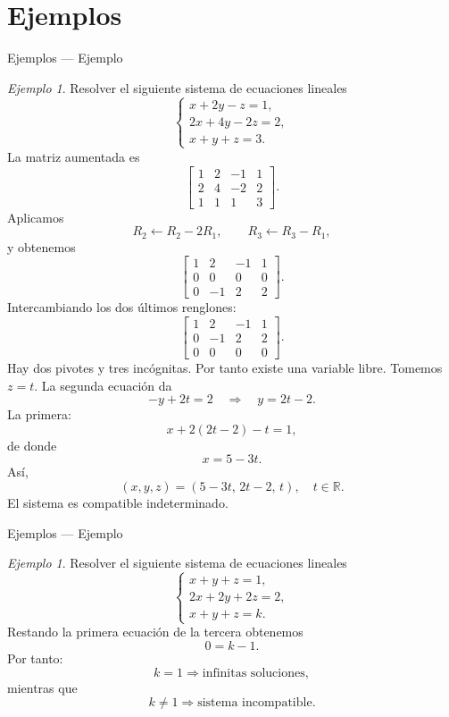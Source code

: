 \documentclass[aspectratio=169,11pt]{beamer}
\theoremstyle{remark}
\newtheorem{Ejem}[definicion]{Ejemplo}
\newcommand{\R}{\mathbb{R}}
\begin{document}
\section{Ejemplos}
\begin{frame}[shrink=5]{Ejemplos — Ejemplo}
\footnotesize
\begin{Ejem} Resolver el siguiente sistema de ecuaciones lineales
\[
\begin{cases}
x+2y-z=1,\\
2x+4y-2z=2,\\
x+y+z=3.
\end{cases}
\]
La matriz aumentada es
\[
\left[
\begin{array}{ccc|c}
1&2&-1&1\\
2&4&-2&2\\
1&1&1&3
\end{array}
\right].
\]
Aplicamos
\[
R_2\leftarrow R_2-2R_1,\qquad
R_3\leftarrow R_3-R_1,
\]
y obtenemos
\[
\left[
\begin{array}{ccc|c}
1&2&-1&1\\
0&0&0&0\\
0&-1&2&2
\end{array}
\right].
\]
Intercambiando los dos últimos renglones:
\[
\left[
\begin{array}{ccc|c}
1&2&-1&1\\
0&-1&2&2\\
0&0&0&0
\end{array}
\right].
\]
Hay dos pivotes y tres incógnitas. Por tanto existe una variable libre. Tomemos $z=t$. La segunda
ecuación da
\[
-y+2t=2\quad\Longrightarrow\quad y=2t-2.
\]
La primera:
\[
x+2(2t-2)-t=1,
\]
de donde
\[
x=5-3t.
\]
Así,
\[
\boxed{(x,y,z)=(5-3t,\,2t-2,\,t),\quad t\in\R.}
\]
El sistema es compatible indeterminado.
\end{Ejem}
\end{frame}

\begin{frame}[shrink=5]{Ejemplos — Ejemplo}
\footnotesize
\begin{Ejem} Resolver el siguiente sistema de ecuaciones lineales
\[
\begin{cases}
x+y+z=1,\\
2x+2y+2z=2,\\
x+y+z=k.
\end{cases}
\]
Restando la primera ecuación de la tercera obtenemos
\[
0=k-1.
\]
Por tanto:
\[
k=1\Longrightarrow\text{infinitas soluciones},
\]
mientras que
\[
k\neq1\Longrightarrow\text{sistema incompatible}.
\]
\end{Ejem}
\end{frame}
\end{document}
